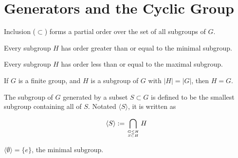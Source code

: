 \section{Generators and the Cyclic Group}

\begin{theorem}
    \label{theorem : subgroupOrder}
    \leanok
    Inclusion ($\subset$) forms a partial order over the set of all subgroups of $G$.
\end{theorem}

\begin{theorem}
    \label{theorem : Minimal_smallest}
    \leanok
    Every subgroup $H$ has order greater than or equal to the minimal subgroup.
\end{theorem}

\begin{theorem}
    \label{theorem : Maximal_largest}
    \leanok
    Every subgroup $H$ has order less than or equal to the maximal subgroup.
\end{theorem}

\begin{theorem}
    \label{definition : subgroup_eq_Maximal_of_card_eq_G}
    If $G$ is a finite group, and $H$ is a subgroup of $G$ with $|H| = |G|$, then $H = G$.
\end{theorem}

\begin{definition}
    \label{definition : Generate}
    \leanok
    The subgroup of $G$ generated by a subset $S \subset G$ is defined to be the smallest subgroup containing all of $S$. Notated $\langle S \rangle$, it is written as

    \begin{equation*}
        \langle S \rangle := \bigcap_{\genfrac{}{}{0pt}{}{G \le H}{S \subset H}} H
    \end{equation*}
\end{definition}

\begin{theorem}
    \label{theorem : Generate_empty}
    \leanok
    $\langle \emptyset \rangle = \{e\}$, the minimal subgroup.
\end{theorem}

